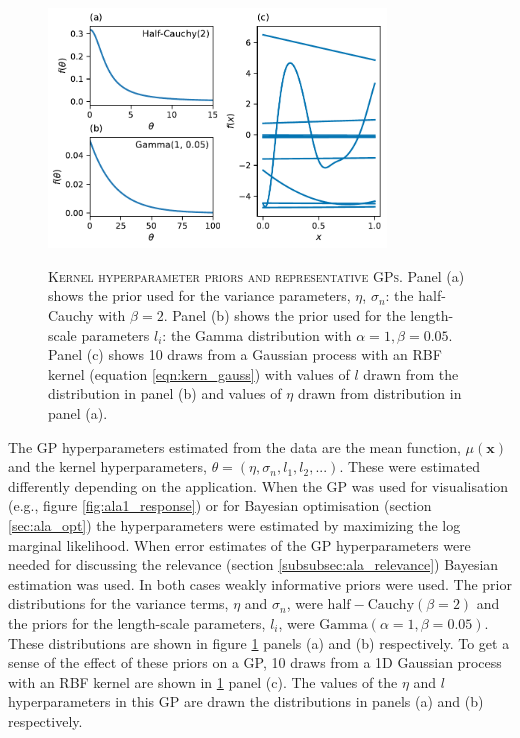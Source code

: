 \begin{figure}
    \centering
    \caption[Kernel hyperparameter priors and representative GPs]{\textsc{Kernel hyperparameter priors and representative GPs}. Panel (a) shows the prior used for the variance parameters, $\eta$, $\sigma_n$: the half-Cauchy with $\beta=2$. Panel (b) shows the prior used for the length-scale parameters $l_{i}$: the Gamma distribution with $\alpha=1, \beta=0.05$.  Panel (c) shows 10 draws from a Gaussian process with an RBF kernel (equation \ref{eqn:kern_gauss}) with values of $l$ drawn from the distribution in panel (b) and values of $\eta$ drawn from distribution in panel (a).}
    \includegraphics[width=0.8\textwidth]{chapters/msm_optimization/figures/prior_functions.pdf}
    \label{fig:priors}
\end{figure}

The GP hyperparameters estimated from the data are the mean function, $\mu(\mathbf{x})$ and the kernel hyperparameters, $\theta = (\eta, \sigma_{n}, l_{1}, l_{2}, ...)$. These were estimated differently depending on the application. When the GP was used for visualisation (e.g., figure \ref{fig:ala1_response}) or for Bayesian optimisation (section \ref{sec:ala_opt}) the hyperparameters were estimated by maximizing the log marginal likelihood. When error estimates of the GP hyperparameters were needed for discussing the relevance (section \ref{subsubsec:ala_relevance}) Bayesian estimation was used. In both cases  weakly informative priors were used. The prior distributions for the variance terms, $\eta$ and $\sigma_{n}$, were $\mathrm{half-Cauchy}(\beta=2)$ and the priors for the length-scale parameters, $l_{i}$, were $\mathrm{Gamma}(\alpha=1, \beta=0.05)$. These distributions are shown in figure \ref{fig:priors} panels (a) and (b) respectively.  To get a sense of the effect of these priors on a GP, 10 draws from a 1D Gaussian process with an RBF kernel are shown in  \ref{fig:priors} panel (c). The values of the $\eta$ and $l$ hyperparameters in this GP are drawn the distributions in panels (a) and (b) respectively.  

